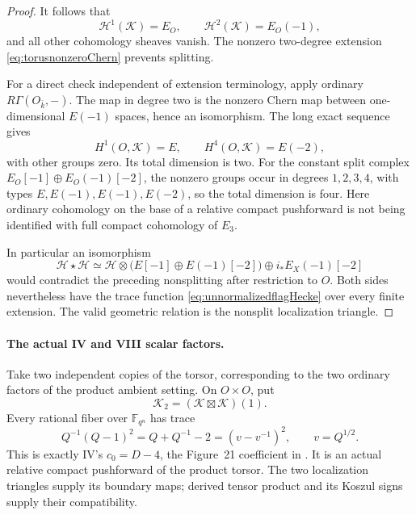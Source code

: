 \begin{proof}
It follows that
\[
 \mathcal H^1(\mathcal K)=E_O,\qquad
 \mathcal H^2(\mathcal K)=E_O(-1),
\]
and all other cohomology sheaves vanish. The nonzero
two-degree extension \eqref{eq:torusnonzeroChern} prevents
splitting.

For a direct check independent of extension terminology,
apply ordinary \(R\Gamma(O_{\bar k},-)\).
The map in degree two is the nonzero Chern map between
one-dimensional \(E(-1)\) spaces, hence an isomorphism.
The long exact sequence gives
\begin{equation}\label{eq:relativeTorusHypercohomology}
 H^1(O,\mathcal K)=E,\qquad
 H^4(O,\mathcal K)=E(-2),
\end{equation}
with other groups zero.
Its total dimension is two. For the constant split complex
\(E_O[-1]\oplus E_O(-1)[-2]\), the nonzero groups occur
in degrees \(1,2,3,4\), with types
\(E,E(-1),E(-1),E(-2)\), so the total dimension is four.
Here ordinary cohomology on the base of a relative compact
pushforward is not being identified with full compact
cohomology of \(E_3\).

In particular an isomorphism
\[
 \mathcal H\star\mathcal H\simeq
 \mathcal H\otimes\bigl(E[-1]\oplus E(-1)[-2]\bigr)
       \oplus i_*E_X(-1)[-2]
\]
would contradict the preceding nonsplitting after restriction
to \(O\).
Both sides nevertheless have the trace function
\eqref{eq:unnormalizedflagHecke} over every finite extension.
The valid geometric relation is the nonsplit localization
triangle.
\end{proof}

\paragraph{The actual IV and VIII scalar factors.}
Take two independent copies of the torsor, corresponding to
the two ordinary factors of the product ambient setting.
On \(O\times O\), put
\[
                   \mathcal K_2=(\mathcal K\boxtimes\mathcal K)(1).
\]
Every rational fiber over \(\mathbb F_{q^n}\) has trace
\begin{equation}\label{eq:relativeczerotrace}
 Q^{-1}(Q-1)^2=Q+Q^{-1}-2
             =(v-v^{-1})^2,\qquad v=Q^{1/2}.
\end{equation}
This is exactly IV's \(c_0=D-4\), the Figure~21 coefficient
in  \cite[Example~19.3, pp.~133--135]{IV}.
It is an actual relative compact pushforward of the product
torsor. The two localization triangles supply its boundary
maps; derived tensor product and its Koszul signs supply
their compatibility.

